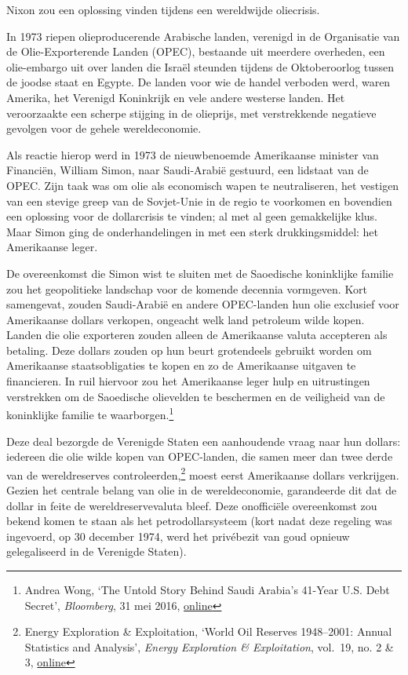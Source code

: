 \documentclass[
  a5paper,
  smalldemyvopaper,11pt,twoside,onecolumn,openright,extrafontsizes]{memoir}
\begin{document}
Nixon zou een oplossing vinden tijdens een wereldwijde oliecrisis.

In 1973 riepen olieproducerende Arabische landen, verenigd in de
Organisatie van de Olie-Exporterende Landen (OPEC), bestaande uit
meerdere overheden, een olie-embargo uit over landen die Israël steunden
tijdens de Oktoberoorlog tussen de joodse staat en Egypte. De landen
voor wie de handel verboden werd, waren Amerika, het Verenigd Koninkrijk
en vele andere westerse landen. Het veroorzaakte een scherpe stijging in
de olieprijs, met verstrekkende negatieve gevolgen voor de gehele
wereldeconomie.

Als reactie hierop werd in 1973 de nieuwbenoemde Amerikaanse minister
van Financiën, William Simon, naar Saudi-Arabië gestuurd, een lidstaat
van de OPEC. Zijn taak was om olie als economisch wapen te
neutraliseren, het vestigen van een stevige greep van de Sovjet-Unie in
de regio te voorkomen en bovendien een oplossing voor de dollarcrisis te
vinden; al met al geen gemakkelijke klus. Maar Simon ging de
onderhandelingen in met een sterk drukkingsmiddel: het Amerikaanse
leger.

De overeenkomst die Simon wist te sluiten met de Saoedische koninklijke
familie zou het geopolitieke landschap voor de komende decennia
vormgeven. Kort samengevat, zouden Saudi-Arabië en andere OPEC-landen
hun olie exclusief voor Amerikaanse dollars verkopen, ongeacht welk land
petroleum wilde kopen. Landen die olie exporteren zouden alleen de
Amerikaanse valuta accepteren als betaling. Deze dollars zouden op hun
beurt grotendeels gebruikt worden om Amerikaanse staatsobligaties te
kopen en zo de Amerikaanse uitgaven te financieren. In ruil hiervoor zou
het Amerikaanse leger hulp en uitrustingen verstrekken om de Saoedische
olievelden te beschermen en de veiligheid van de koninklijke familie te
waarborgen.\footnote{Andrea Wong, `The Untold Story Behind Saudi
  Arabia's 41-Year U.S. Debt Secret', \emph{Bloomberg}, 31 mei 2016,
  \href{https://www.bloomberg.com/news/features/2016-05-30/the-untold-story-behind-saudi-arabia-s-41-year-u-s-debt-secret}{online}}

Deze deal bezorgde de Verenigde Staten een aanhoudende vraag naar hun
dollars: iedereen die olie wilde kopen van OPEC-landen, die samen meer
dan twee derde van de wereldreserves controleerden,\footnote{Energy
  Exploration \& Exploitation, `World Oil Reserves 1948--2001: Annual
  Statistics and Analysis', \emph{Energy Exploration \& Exploitation},
  vol.~19, no. 2 \& 3,
  \href{https://journals.sagepub.com/doi/pdf/10.1260/0144598011492561}{online}}
moest eerst Amerikaanse dollars verkrijgen. Gezien het centrale belang
van olie in de wereldeconomie, garandeerde dit dat de dollar in feite de
wereldreservevaluta bleef. Deze onofficiële overeenkomst zou bekend
komen te staan als het petrodollarsysteem (kort nadat deze regeling was
ingevoerd, op 30 december 1974, werd het privébezit van goud opnieuw
gelegaliseerd in de Verenigde Staten).
\end{document}
